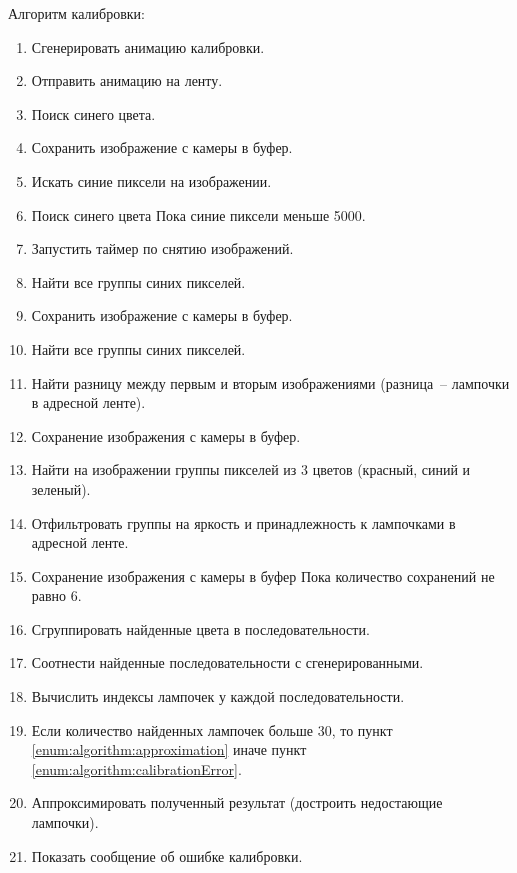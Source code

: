 Алгоритм калибровки:
\begin{enumerate}[label=\arabic*]
	\item Сгенерировать анимацию калибровки.
	\item Отправить анимацию на ленту.
	\item Поиск синего цвета.
	\item Сохранить изображение с камеры в буфер.
	\item Искать синие пиксели на изображении.
	\item Поиск синего цвета Пока синие пиксели меньше 5000.
	\item Запустить таймер по снятию изображений.
	\item Найти все группы синих пикселей.
	\item Сохранить изображение с камеры в буфер.
	\item Найти все группы синих пикселей.
	\item Найти разницу между первым и вторым изображениями (разница~-- лампочки в адресной ленте).
	\item Сохранение изображения с камеры в буфер.
	\item Найти на изображении группы пикселей из 3 цветов (красный, синий и зеленый).
	\item Отфильтровать группы на яркость и принадлежность к лампочками в адресной ленте.
	\item Сохранение изображения с камеры в буфер Пока количество сохранений не равно 6.
	\item Сгруппировать найденные цвета в последовательности.
	\item Соотнести найденные последовательности с сгенерированными.
	\item Вычислить индексы лампочек у каждой последовательности.
	\item Если количество найденных лампочек больше 30, то пункт \ref{enum:algorithm:approximation} иначе пункт \ref{enum:algorithm:calibrationError}.
	\item \label{enum:algorithm:approximation} Аппроксимировать полученный результат (достроить недостающие лампочки).
	\item \label{enum:algorithm:calibrationError} Показать сообщение об ошибке калибровки.
\end{enumerate}

